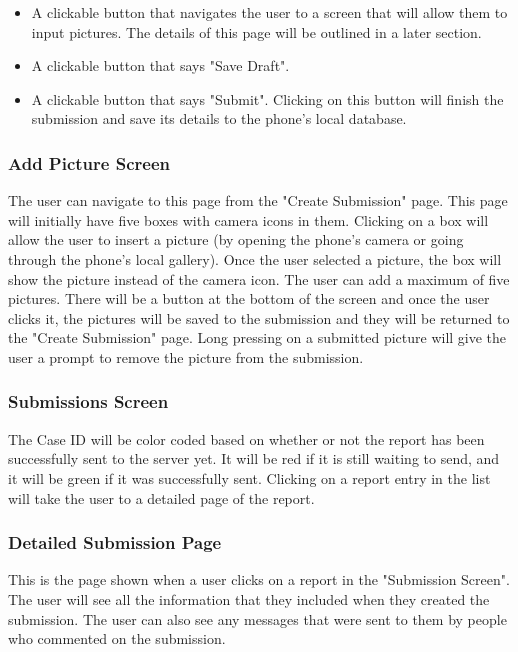 \documentclass[onecolumn, draftclsnofoot,10pt, compsoc]{IEEEtran}
\begin{document}
\begin{itemize}
\item A clickable button that navigates the user to a screen that will allow them to input pictures. The details of this page will be outlined in a later section.

\item A clickable button that says "Save Draft".

\item A clickable button that says "Submit". Clicking on this button will finish the submission and save its details to the phone's local database.
\end{itemize}

\subsubsection{Add Picture Screen} 
The user can navigate to this page from the "Create Submission" page. This page will initially have five boxes with camera icons in them. Clicking on a box will allow the user to insert a picture (by opening the phone's camera or going through the phone's local gallery). Once the user selected a picture, the box will show the picture instead of the camera icon. The user can add a maximum of five pictures. There will be a button at the bottom of the screen and once the user clicks it, the pictures will be saved to the submission and they will be returned to the "Create Submission" page. Long pressing on a submitted picture will give the user a prompt to remove the picture from the submission.




\subsubsection{Submissions Screen}
The Case ID will be color coded based on whether or not the report has been successfully sent to the server yet. It will be red if it is still waiting to send, and it will be green if it was successfully sent. Clicking on a report entry in the list will take the user to a detailed page of the report.


\subsubsection{Detailed Submission Page}
This is the page shown when a user clicks on a report in the "Submission Screen". The user will see all the information that they included when they created the submission. The user can also see any messages that were sent to them by people who commented on the submission.
\end{document}
